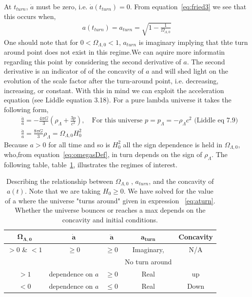 \documentclass[twoside]{article}
\begin{document}
At $t_{turn}$, $\dot{a}$ must be zero, i.e. $\dot{a}(t_{turn}) = 0$. From equation~\ref{eq:fried3} we see that this occurs when,
\begin{align}
a(t_{turn}) = a_{turn}=\sqrt{1-\frac{1}{\Omega_{\Lambda,0}}}\label{eq:aturn}
\end{align}
One should note that for $0<\Omega_{\Lambda,0}<1$,  $a_{turn}$ is imaginary implying that thte turn around point does not exist in this regime.We can aquire more informatin regarding this point by considering the second derivative of $a$. The second derivative is an indicator of of the concavity of $a$ and will shed light on the evolution of the scale factor after the turn-around point, i.e. decreasing, increasing, or constant. With this in mind we can exploit the acceleration equation (see Liddle equation 3.18). For a pure lambda universe it takes the following form,
\begin{align}
&\frac{\ddot{a}}{a} = -\frac{4\pi G}{3}
\left( \rho_{\Lambda}+\frac{3p}{c^{2}}\right),\quad\text{For this universe $p=p_{\Lambda} = -\rho_{\Lambda}c^{2}$ (Liddle eq~7.9)}\\
&\frac{\ddot{a}}{a} = \frac{8\pi G}{3} \rho_{\Lambda} = \Omega_{\Lambda,0}H_{0}^{2}\label{eq:acce}
\end{align}
Because $a>0$ for all time and so is $H_{0}^{2}$ all the sign dependence is held in $\Omega_{\Lambda,0}$, who,from equation~\ref{eq:omegasDef}, in turn depends on the sign of $\rho_{\Lambda}$. The following table, table~\ref{t:turnAround}, illustrates the regimes of interest.

 \begin{table}[h!]
  \begin{center}
    \begin{tabular}{ c| c c c c }
    \hline\hline
    $\boldsymbol{\Omega_{\Lambda,0}}$&$\boldsymbol{\dot{a}}$&$\boldsymbol{\ddot{a}}$&$\boldsymbol{a_{turn}}$& \textbf{Concavity}\\\hline\hline
    $>0$ \& $<1$&$\ge 0$&$\geq 0$&Imaginary,&N/A\\&&& No turn around&\\
    $>1$&dependence on $a$&$\geq 0$& Real & up\\
    $<0$&dependence on $a$&$\leq 0$& Real & Down\\
  
    \end{tabular}
  \end{center}
  \caption{Describing the relationship between $\Omega_{\Lambda,0}$ , $a_{turn}$, and the concavity of $a(t)$. Note that we are taking $H_{0} \ge 0$. We have solved for the value of a where the universe "turns around" given in expression ~\ref{eq:aturn}. Whether the universe bounces or reaches a max depends on the concavity and initial conditions.}\label{t:turnAround}
\end{table}
\end{document}
